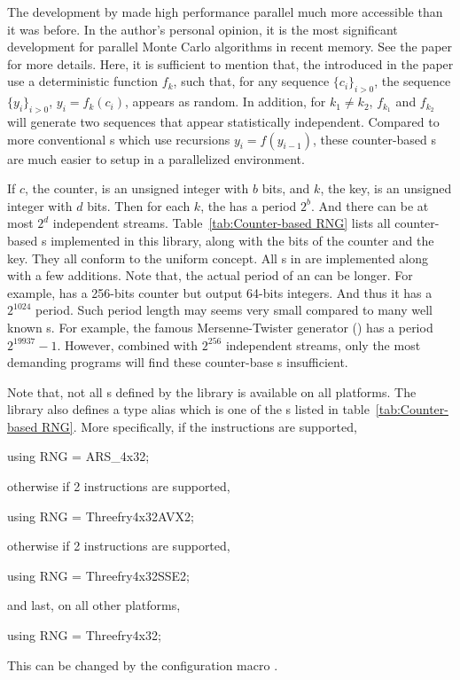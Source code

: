 \documentclass[11pt,bib,mint,hyper,altcolor]{marticle}
\begin{document}
The development by \textcite{Salmon:2011um} made high performance parallel \rng
much more accessible than it was before. In the author's personal opinion, it
is the most significant development for parallel Monte Carlo algorithms in
recent memory. See the paper for more details. Here, it is sufficient to
mention that, the \rng introduced in the paper use a deterministic function
$f_k$, such that, for any sequence $\{c_i\}_{i>0}$, the sequence
$\{y_i\}_{i>0}$, $y_i = f_k(c_i)$, appears as random. In addition, for $k_1 \ne
k_2$, $f_{k_1}$ and $f_{k_2}$ will generate two sequences that appear
statistically independent. Compared to more conventional \rng{}s which use
recursions $y_i = f(y_{i - 1})$, these counter-based \rng{}s are much easier to
setup in a parallelized environment.

If $c$, the counter, is an unsigned integer with $b$ bits, and $k$, the key, is
an unsigned integer with $d$ bits. Then for each $k$, the \rng has a period
$2^b$. And there can be at most $2^d$ independent streams.
Table~\ref{tab:Counter-based RNG} lists all counter-based \rng{}s implemented
in this library, along with the bits of the counter and the key. They all
conform to the \cppoo uniform \rng concept. All \rng{}s in
\textcite{Salmon:2011um} are implemented along with a few additions. Note that,
the actual period of an \rng can be longer. For example, 
has a 256-bits counter but output 64-bits integers. And thus it has a
$2^{1024}$ period. Such period length may seems very small compared to many
well known \rng{}s. For example, the famous Mersenne-Twister generator
() has a period $2^{19937} - 1$. However, combined with
$2^{256}$ independent streams, only the most demanding programs will find these
counter-base \rng{}s insufficient.

Note that, not all \rng{}s defined by the library is available on all
platforms. The library also defines a type alias  which is one
of the \rng{}s listed in table~\ref{tab:Counter-based RNG}. More specifically,
if the \aesni instructions are supported,
\begin{cppcode}
  using RNG = ARS_4x32;
\end{cppcode}
otherwise if \avx{}2 instructions are supported,
\begin{cppcode}
  using RNG = Threefry4x32AVX2;
\end{cppcode}
otherwise if \sse{}2 instructions are supported,
\begin{cppcode}
  using RNG = Threefry4x32SSE2;
\end{cppcode}
and last, on all other platforms,
\begin{cppcode}
  using RNG = Threefry4x32;
\end{cppcode}
This can be changed by the configuration macro .
\end{document}
